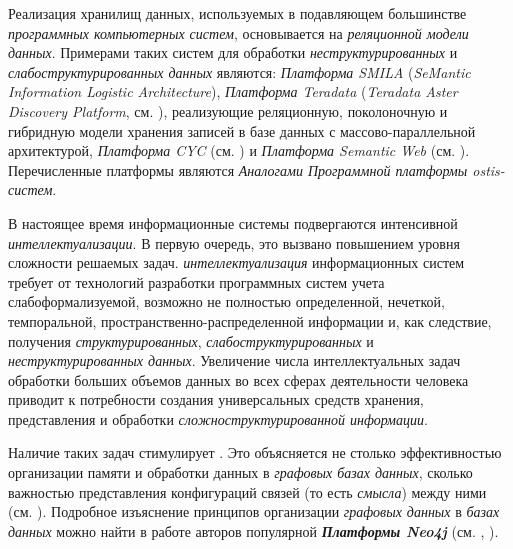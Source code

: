 Реализация хранилищ данных, используемых в подавляющем большинстве \textit{программных компьютерных систем}, основывается на \textit{реляционной модели данных}. Примерами таких систем для обработки \textit{неструктурированных} и \textit{слабоструктурированных данных} являются: \textit{Платформа SMILA} (\textit{SeMantic Information Logistic Architecture}), \textit{Платформа Teradata} (\textit{Teradata Aster Discovery Platform}, см. ), реализующие реляционную, поколоночную и гибридную модели хранения записей в базе данных с массово-параллельной архитектурой, \textit{Платформа CYC} (см. ) и \textit{Платформа Semantic Web} (см. ). Перечисленные платформы являются \textit{Аналогами Программной платформы ostis-систем}.

В настоящее время информационные системы подвергаются интенсивной \textit{интеллектуализации}. В первую очередь, это вызвано повышением уровня сложности решаемых задач. \textit{интеллектуализация} информационных систем требует от технологий разработки программных систем учета слабоформализуемой, возможно не полностью определенной, нечеткой, темпоральной, пространственно-распределенной информации и, как следствие, получения \textit{структурированных}, \textit{слабоструктурированных} и \textit{неструктурированных данных}. Увеличение числа интеллектуальных задач обработки больших объемов данных во всех сферах деятельности человека приводит к потребности создания универсальных средств хранения, представления и обработки \textit{сложноструктурированной информации}.

Наличие таких задач стимулирует . Это объясняется не столько эффективностью организации памяти и обработки данных в \textit{графовых базах данных}, сколько важностью представления конфигураций связей (то есть \textit{смысла}) между ними (см. ). Подробное изъяснение принципов организации \textit{графовых данных} в \textit{базах данных} можно найти в работе авторов популярной  \textbf{\textit{Платформы Neo4j}} (см. , ).

